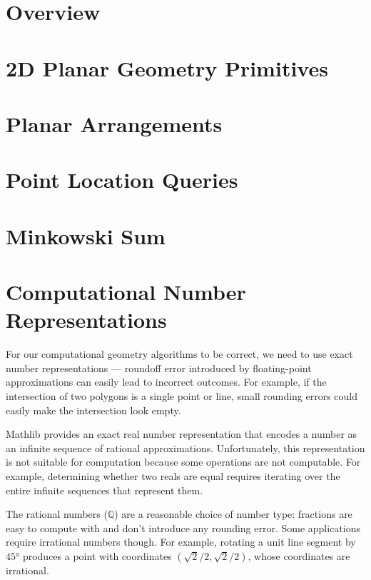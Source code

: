 \newtheorem{definition}{Definition}
\newtheorem{theorem}{Theorem}
\newtheorem{lemma}{Lemma}
\newtheorem{corollary}{Corollary}

\chapter{Overview}

\chapter{2D Planar Geometry Primitives}

\chapter{Planar Arrangements}

\chapter{Point Location Queries}

\chapter{Minkowski Sum}

\chapter{Computational Number Representations}

For our computational geometry algorithms to be correct, we need to use exact
number representations --- roundoff error introduced by floating-point
approximations can easily lead to incorrect outcomes.  For example,
if the intersection of two polygons is a single point or line, small rounding
errors could easily make the intersection look empty.

Mathlib provides an exact real number representation that encodes a number as
an infinite sequence of rational approximations. Unfortunately, this
representation is not suitable for computation because some operations are not
computable. For example, determining whether two reals are equal requires
iterating over the entire infinite sequences that represent them.

The rational numbers ($ℚ$) are a reasonable choice of number type: fractions are easy
to compute with and don't introduce any rounding error. Some applications
require irrational numbers though. For example, rotating a unit line segment by
$45°$ produces a point with coordinates $(\sqrt{2}/2, \sqrt{2}/2)$, whose
coordinates are irrational.

